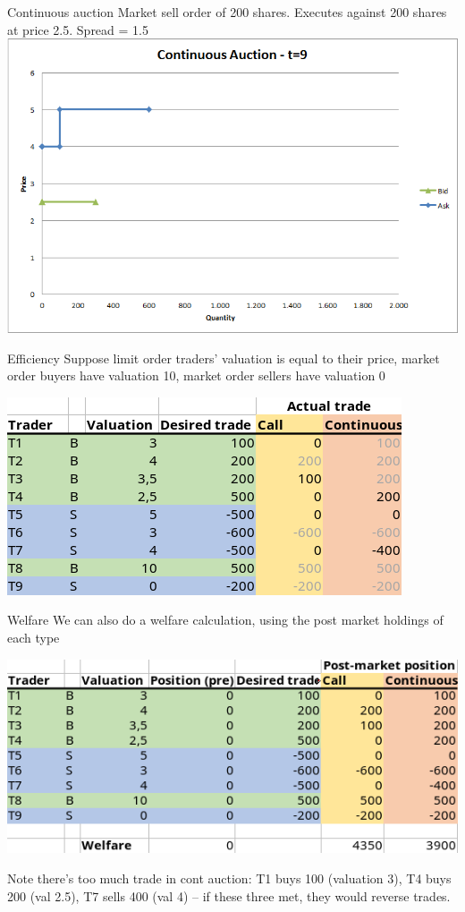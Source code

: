 \documentclass[english,10pt
,aspectratio=169
]{beamer}
\begin{document}
\begin{frame}{Continuous auction}
	Market sell order of 200 shares. Executes against 200 shares at price 2.5. Spread = 1.5
	\center
	\includegraphics[width=.75\linewidth]{pics/ch1/Continuous_t9}
\end{frame}


\begin{frame}{Efficiency}
	Suppose limit order traders' valuation is equal to their price, market order buyers have valuation 10, market order sellers have valuation 0
	
	{\center
		\includegraphics[width=.6\linewidth]{pics/ch1/Efficiency4}
	\\
	}
	
\end{frame}


\begin{frame}{Welfare}
	We can also do a welfare calculation, using the post market holdings of each type
	
	{\center
	\includegraphics[width=.6\linewidth]{pics/ch1/Welfare4}
	\\
	}
	
	Note there's too much trade in cont auction: T1 buys 100 (valuation 3), T4 buys 200 (val 2.5), T7 sells 400 (val 4) -- if these three met, they would reverse trades.
\end{frame}
\end{document}
